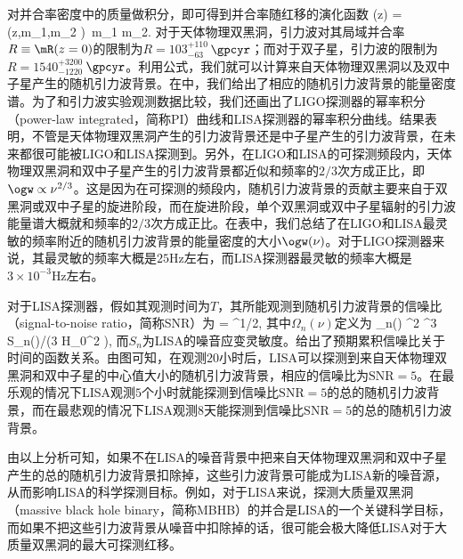 对并合率密度中的质量做积分，即可得到并合率随红移的演化函数
\e
\mR(z)  =\int \mR(z,m_{1},m_{2} )\, \rmd m_{1} m_{2}.
\q
对于天体物理双黑洞，引力波对其局域并合率$R \equiv \mR(z=0)$的限制为$R = 103_{-63}^{+110}$\,$\gpcyr$\citep{Abbott:2017vtc}；而对于双子星，引力波的限制为$R = 1540_{-1220}^{+3200}$\,$\gpcyr$\citep{TheLIGOScientific:2017qsa}。利用公式，我们就可以计算来自天体物理双黑洞以及双中子星产生的随机引力波背景。在中，我们给出了相应的随机引力波背景的能量密度谱。为了和引力波实验观测数据比较，我们还画出了LIGO探测器\citep{TheLIGOScientific:2017qsa}的幂率积分（power-law integrated，简称PI）曲线和LISA探测器\citep{Cornish:2017vip,Cornish:2018dyw}的幂率积分曲线。结果表明，不管是天体物理双黑洞产生的引力波背景还是中子星产生的引力波背景，在未来都很可能被LIGO和LISA探测到。另外，在LIGO和LISA的可探测频段内，天体物理双黑洞和双中子星产生的引力波背景都近似和频率的$2/3$次方成正比，即$\ogw \propto \nu^{2/3}$。这是因为在可探测的频段内，随机引力波背景的贡献主要来自于双黑洞或双中子星的旋进阶段，而在旋进阶段，单个双黑洞或双中子星辐射的引力波能量谱大概就和频率的$2/3$次方成正比。在表中，我们总结了在LIGO和LISA最灵敏的频率附近的随机引力波背景的能量密度的大小$\ogw (\nu)$。对于LIGO探测器来说，其最灵敏的频率大概是$25$Hz左右，而LISA探测器最灵敏的频率大概是$3\times 10^{-3}$Hz左右。


对于LISA探测器，假如其观测时间为$T$，其所能观测到随机引力波背景的信噪比（signal-to-noise ratio，简称SNR）为\citep{Thrane:2013oya,Caprini:2015zlo}
\e
{}=  ^{1/2},
\q
其中$\Omega_{n}(\nu)$定义为
\e 
\Omega_{n}(\nu) \pi^2 \nu^3 S_{n}(\nu)/\left(3 H_{0}^2 \right),
\q 
而$S_{n}$为LISA的噪音应变灵敏度。给出了预期累积信噪比关于时间的函数关系。由图可知，在观测$20$小时后，LISA可以探测到来自天体物理双黑洞和双中子星的中心值大小的随机引力波背景，相应的信噪比为$\mathrm{SNR} = 5$。在最乐观的情况下LISA观测$5$个小时就能探测到信噪比$\mathrm{SNR} = 5$的总的随机引力波背景，而在最悲观的情况下LISA观测$8$天能探测到信噪比$\mathrm{SNR} = 5$的总的随机引力波背景。

由以上分析可知，如果不在LISA的噪音背景中把来自天体物理双黑洞和双中子星产生的总的随机引力波背景扣除掉，这些引力波背景可能成为LISA新的噪音源，从而影响LISA的科学探测目标。例如，对于LISA来说，探测大质量双黑洞（massive black hole binary，简称MBHB）的并合是LISA的一个关键科学目标\citep{Audley:2017drz}，而如果不把这些引力波背景从噪音中扣除掉的话，很可能会极大降低LISA对于大质量双黑洞的最大可探测红移。 


